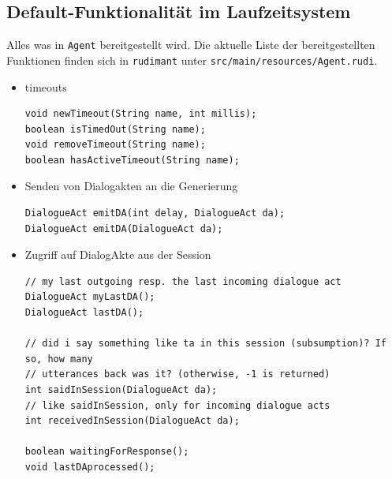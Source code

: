 \subsection{Default-Funktionalität im Laufzeitsystem}
Alles was in \texttt{Agent} bereitgestellt wird. Die aktuelle Liste der
bereitgestellten Funktionen finden sich in \texttt{rudimant} unter
\texttt{src/main/resources/Agent.rudi}.

\begin{itemize}
\item timeouts
\begin{verbatim}
void newTimeout(String name, int millis);
boolean isTimedOut(String name);
void removeTimeout(String name);
boolean hasActiveTimeout(String name);
\end{verbatim}
\item Senden von Dialogakten an die Generierung
\begin{verbatim}
DialogueAct emitDA(int delay, DialogueAct da);
DialogueAct emitDA(DialogueAct da);
\end{verbatim}
\item Zugriff auf DialogAkte aus der Session
\begin{verbatim}
// my last outgoing resp. the last incoming dialogue act
DialogueAct myLastDA();
DialogueAct lastDA();

// did i say something like ta in this session (subsumption)? If so, how many
// utterances back was it? (otherwise, -1 is returned)
int saidInSession(DialogueAct da);
// like saidInSession, only for incoming dialogue acts
int receivedInSession(DialogueAct da);

boolean waitingForResponse();
void lastDAprocessed();
\end{verbatim}
\end{itemize}

